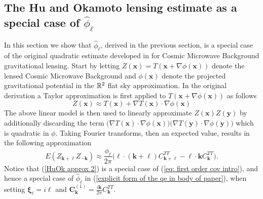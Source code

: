 \documentclass[10pt,noinfoline]{imsart}
\newcommand{\bs}{\boldsymbol}
\begin{document}
\subsection{The Hu and Okamoto lensing estimate as a special case of $\hat\phi_{\bs \ell}$}
\label{section: Hu and Okamoto lensing special case}

In this section we show that $\hat \phi_{\bs \ell}$, derived in the previous section, is a special case of the original quadratic estimate developed in \cite{hu2001mapping, hu2002mass} for Cosmic Microwave Background gravitational lensing. Start by letting $Z(\bs x) = T(\bs x + \nabla \phi(\bs x))$  denote the lensed Cosmic Microwave Background  and $\phi(\bs x)$ denote the projected gravitational potential in the $\Bbb R^2$ flat sky approximation. In the original derivation \cite{hu2001mapping, hu2002mass} a Taylor approximation is first applied to $T(\bs x+ \nabla \phi(\bs x))$ as follows
\begin{equation}
\label{HuOk approx 1}
Z(\bs x) \approx T(\bs x) +  \nabla T(\bs x)\cdot\nabla \phi(\bs x)
\end{equation}
The above linear model is then used to linearly approximate $Z(\bs x)Z(\bs y)$ by additionally discarding the term $\big(\nabla T(\bs x)\cdot\nabla \phi(\bs x)\big) \big(\nabla T(\bs y)\cdot\nabla \phi(\bs y)\big)$ which is quadratic in $\phi$. Taking Fourier transforms, then an expected value, results in the following approximation
\begin{equation}
\label{HuOk approx 2}
E(Z_{\bs k+\bs \ell}Z_{-\bs k}) \approx \frac{\phi_{\bs \ell}}{2\pi} \Big(\bs \ell\cdot(\bs k+\bs \ell)C^{TT}_{\bs k+\bs \ell} - \bs \ell\cdot\bs k C^{TT}_{\bs k}\Big).
\end{equation}
Notice that (\ref{HuOk approx 2}) is a special case of (\ref{eq: first order cov intro}), and hence a special case of $\hat\phi_{\bs \ell}$ in (\ref{explicit form of the qe in body of paper}), when setting $\bs \xi_{\bs \ell} = i\bs \ell$ and $\bs C^{(1)}_{\bs k} = \frac{i\bs k}{2\pi}  C^{TT}_{\bs k}$.
\end{document}
